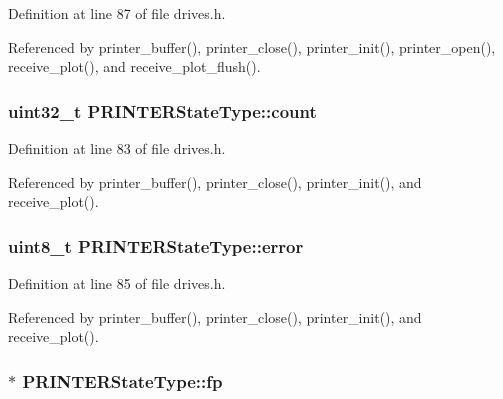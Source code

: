 Definition at line 87 of file drives.\+h.



Referenced by printer\+\_\+buffer(), printer\+\_\+close(), printer\+\_\+init(), printer\+\_\+open(), receive\+\_\+plot(), and receive\+\_\+plot\+\_\+flush().

\subsubsection[{\texorpdfstring{count}{count}}]{\setlength{\rightskip}{0pt plus 5cm}uint32\+\_\+t P\+R\+I\+N\+T\+E\+R\+State\+Type\+::count}\hypertarget{structPRINTERStateType_ae115fc351910f3801e37b31f254fb8f4}{}\label{structPRINTERStateType_ae115fc351910f3801e37b31f254fb8f4}


Definition at line 83 of file drives.\+h.



Referenced by printer\+\_\+buffer(), printer\+\_\+close(), printer\+\_\+init(), and receive\+\_\+plot().

\subsubsection[{\texorpdfstring{error}{error}}]{\setlength{\rightskip}{0pt plus 5cm}uint8\+\_\+t P\+R\+I\+N\+T\+E\+R\+State\+Type\+::error}\hypertarget{structPRINTERStateType_a6e5b550f5396901febd5475445132dd0}{}\label{structPRINTERStateType_a6e5b550f5396901febd5475445132dd0}


Definition at line 85 of file drives.\+h.



Referenced by printer\+\_\+buffer(), printer\+\_\+close(), printer\+\_\+init(), and receive\+\_\+plot().

\subsubsection[{\texorpdfstring{fp}{fp}}]{$\ast$ P\+R\+I\+N\+T\+E\+R\+State\+Type\+::fp}\hypertarget{structPRINTERStateType_a791c78d68d169f9d2e60d34b890e520a}{}\label{structPRINTERStateType_a791c78d68d169f9d2e60d34b890e520a}


